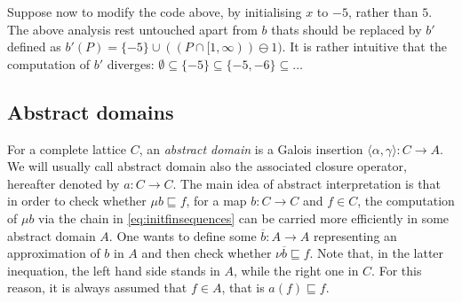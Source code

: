 \documentclass{llncs}
\begin{document}
Suppose now to modify the code above, by initialising  \texttt{$x$} to $-5$, rather than $5$. The above analysis rest untouched  apart from $b$ thats should be replaced by $b'$ defined as $b'(P) = \{-5\} \cup ( (P\cap [1,\infty) ) \ominus\! 1 )$. It is rather intuitive that the computation of $b'$ diverges: $\emptyset \subseteq \{-5\} \subseteq \{-5,-6\} \subseteq \dots$

\subsection{Abstract domains}
For a complete lattice $C$, an \emph{abstract domain} is a Galois insertion $\langle \alpha, \gamma\rangle \colon C \to A$. We will usually call abstract domain also the associated  closure operator, hereafter denoted by $a\colon C \to C$. 
The main idea of abstract interpretation is that in order to check whether $\mu b \sqsubseteq f$, for a map $b\colon C \to C$ and $f\in C$, the computation of $\mu b$ via the chain in \eqref{eq:initfinsequences} can be carried more efficiently in some abstract domain $A$. One wants to define some $\overline{b}\colon A\to A$ representing an approximation of $b$ in $A$ and then check whether $\nu \overline{b} \sqsubseteq f$. Note that, in the latter inequation, the left hand side  stands in $A$, while the right one in $C$. For this reason, it is always assumed that $f\in A$, that is $a(f)\sqsubseteq f$.
\end{document}
